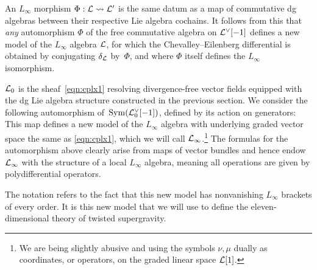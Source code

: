 An $L_\infty$ morphism $\Phi: \mathcal L \rightsquigarrow \mathcal L'$ is the same datum as a map of commutative dg algebras 
between their respective Lie algebra cochains. It follows from this that \emph{any} automorphism $\Phi$ of the free commutative algebra on $\mathcal L^\vee[-1]$ defines a new model of the $L_\infty$ algebra $\mathcal L$, for which the Chevalley--Eilenberg differential is obtained by conjugating $\delta_\mathcal L$ by~$\Phi$, and where $\Phi$ itself defines the $L_\infty$ isomorphism.

$\mathcal L_0$ is the sheaf~\eqref{eqn:cplx1} resolving divergence-free vector fields equipped with the dg Lie algebra structure constructed in the previous section.
We consider the following automorphism of~$\operatorname{Sym}(\mathcal L_0^\vee[-1])$, defined by its action on generators:
This map defines a new model of the $L_\infty$ algebra with underlying graded vector space the same as \eqref{eqn:cplx1}, which we will call $\mathcal L_\infty$.\footnote{We are being slightly abusive and using the symbols $\nu,\mu$ dually as coordinates, or operators, on the graded linear space $\mathcal L[1]$.}
The formulas for the automorphism above clearly arise from maps of vector bundles and hence endow $\mathcal L_\infty$ with the structure of a local $L_\infty$ algebra, meaning all operations are given by polydifferential operators.  

The notation refers to the fact that this new model has nonvanishing $L_\infty$ brackets of every order. 
It is this new model that we will use to define the eleven-dimensional theory of twisted supergravity. 




